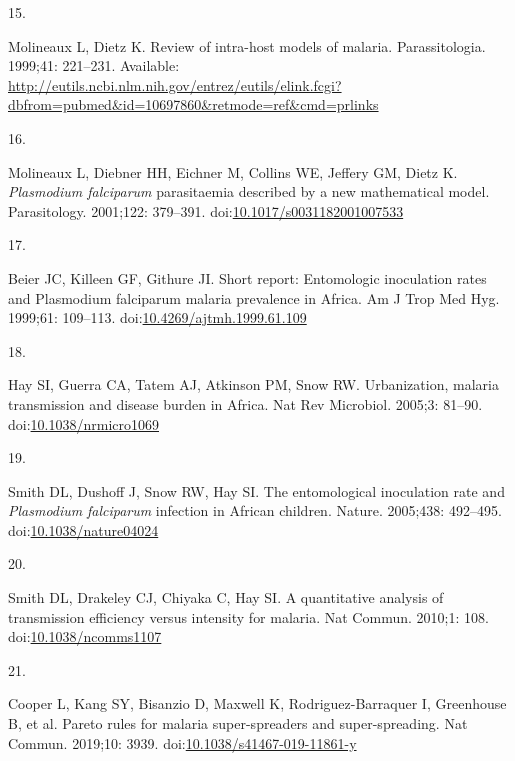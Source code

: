 \documentclass[
]{book}
\newlength{\cslhangindent}
\newlength{\csllabelwidth}
\newlength{\cslentryspacingunit} %
\newenvironment{CSLReferences}[2] %
 {%
  \setlength{\parindent}{0pt}
  \ifodd #1
  \let\oldpar\par
  \def\par{\hangindent=\cslhangindent\oldpar}
  \fi
  \setlength{\parskip}{#2\cslentryspacingunit}
 }%
 {}
\newcommand{\CSLLeftMargin}[1]{\parbox[t]{\csllabelwidth}{#1}}
\newcommand{\CSLRightInline}[1]{\parbox[t]{\linewidth - \csllabelwidth}{#1}\break}
\begin{document}
\begin{CSLReferences}{0}{0}
\leavevmode{}%
\CSLLeftMargin{15. }%
\CSLRightInline{Molineaux L, Dietz K. Review of intra-host models of malaria. Parassitologia. 1999;41: 221--231. Available: \url{http://eutils.ncbi.nlm.nih.gov/entrez/eutils/elink.fcgi?dbfrom=pubmed\&id=10697860\&retmode=ref\&cmd=prlinks}}

\leavevmode{}%
\CSLLeftMargin{16. }%
\CSLRightInline{Molineaux L, Diebner HH, Eichner M, Collins WE, Jeffery GM, Dietz K. \emph{Plasmodium falciparum} parasitaemia described by a new mathematical model. Parasitology. 2001;122: 379--391. doi:\href{https://doi.org/10.1017/s0031182001007533}{10.1017/s0031182001007533}}

\leavevmode{}%
\CSLLeftMargin{17. }%
\CSLRightInline{Beier JC, Killeen GF, Githure JI. Short report: Entomologic inoculation rates and {Plasmodium} falciparum malaria prevalence in {Africa}. Am J Trop Med Hyg. 1999;61: 109--113. doi:\href{https://doi.org/10.4269/ajtmh.1999.61.109}{10.4269/ajtmh.1999.61.109}}

\leavevmode{}%
\CSLLeftMargin{18. }%
\CSLRightInline{Hay SI, Guerra CA, Tatem AJ, Atkinson PM, Snow RW. Urbanization, malaria transmission and disease burden in {Africa}. Nat Rev Microbiol. 2005;3: 81--90. doi:\href{https://doi.org/10.1038/nrmicro1069}{10.1038/nrmicro1069}}

\leavevmode{}%
\CSLLeftMargin{19. }%
\CSLRightInline{Smith DL, Dushoff J, Snow RW, Hay SI. The entomological inoculation rate and {\emph{Plasmodium}} {\emph{falciparum}} infection in {African} children. Nature. 2005;438: 492--495. doi:\href{https://doi.org/10.1038/nature04024}{10.1038/nature04024}}

\leavevmode{}%
\CSLLeftMargin{20. }%
\CSLRightInline{Smith DL, Drakeley CJ, Chiyaka C, Hay SI. A quantitative analysis of transmission efficiency versus intensity for malaria. Nat Commun. 2010;1: 108. doi:\href{https://doi.org/10.1038/ncomms1107}{10.1038/ncomms1107}}

\leavevmode{}%
\CSLLeftMargin{21. }%
\CSLRightInline{Cooper L, Kang SY, Bisanzio D, Maxwell K, Rodriguez-Barraquer I, Greenhouse B, et al. Pareto rules for malaria super-spreaders and super-spreading. Nat Commun. 2019;10: 3939. doi:\href{https://doi.org/10.1038/s41467-019-11861-y}{10.1038/s41467-019-11861-y}}


\end{CSLReferences}
\end{document}

